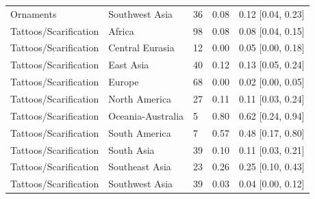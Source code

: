 \begin{longtable}{lllll}
Ornaments & Southwest Asia & 36 & 0.08 & 0.12 [0.04, 0.23] \\
Tattoos/Scarification & Africa & 98 & 0.08 & 0.08 [0.04, 0.15] \\
Tattoos/Scarification & Central Eurasia & 12 & 0.00 & 0.05 [0.00, 0.18] \\
Tattoos/Scarification & East Asia & 40 & 0.12 & 0.13 [0.05, 0.24] \\
Tattoos/Scarification & Europe & 68 & 0.00 & 0.02 [0.00, 0.05] \\
Tattoos/Scarification & North America & 27 & 0.11 & 0.11 [0.03, 0.24] \\
Tattoos/Scarification & Oceania-Australia & 5 & 0.80 & 0.62 [0.24, 0.94] \\
Tattoos/Scarification & South America & 7 & 0.57 & 0.48 [0.17, 0.80] \\
Tattoos/Scarification & South Asia & 39 & 0.10 & 0.11 [0.03, 0.21] \\
Tattoos/Scarification & Southeast Asia & 23 & 0.26 & 0.25 [0.10, 0.43] \\
Tattoos/Scarification & Southwest Asia & 39 & 0.03 & 0.04 [0.00, 0.12] \\
\end{longtable}